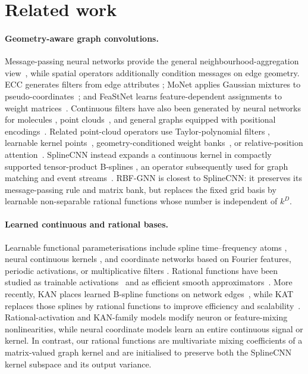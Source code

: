 \documentclass{article} %
\begin{document}
\section{Related work}
\label{sec:related}

\paragraph{Geometry-aware graph convolutions.}
Message-passing neural networks provide the general neighbourhood-aggregation
view~\citep{gilmer2017mpnn}, while spatial operators additionally condition
messages on edge geometry. ECC generates filters from edge attributes
\citep{simonovsky2017ecc}; MoNet applies Gaussian mixtures to
pseudo-coordinates~\citep{monti2017monet}; and FeaStNet learns
feature-dependent assignments to weight matrices~\citep{verma2018feastnet}.
Continuous filters have also been generated by neural networks for molecules
\citep{schutt2017schnet}, point clouds~\citep{wang2018pccnn,wu2019pointconv},
and general graphs equipped with positional encodings~\citep{ma2024ckgconv}.
Related point-cloud operators use Taylor-polynomial filters
\citep{xu2018spidercnn}, learnable kernel points~\citep{thomas2019kpconv},
geometry-conditioned weight banks~\citep{xu2021paconv}, or relative-position
attention~\citep{zhao2021pointtransformer}. SplineCNN instead expands a
continuous kernel in compactly supported tensor-product B-splines
\citep{fey2018splinecnn}, an operator subsequently used for graph matching
\citep{fey2020dgmc} and event streams~\citep{schaefer2022aegnn}. RBF-GNN is
closest to SplineCNN: it preserves its message-passing rule and matrix bank,
but replaces the fixed grid basis by learnable non-separable rational
functions whose number is independent of $k^D$.

\paragraph{Learned continuous and rational bases.}
Learnable functional parameterisations include spline time--frequency atoms
\citep{balestriero2018splinefilters}, neural continuous kernels
\citep{romero2022ckconv,romero2022flexconv}, and coordinate networks based on
Fourier features, periodic activations, or multiplicative filters
\citep{tancik2020fourier,sitzmann2020siren,sahu2021mfn}. Rational functions
have been studied as trainable activations~\citep{molina2020pade} and as
efficient smooth approximators~\citep{boulle2020rational}. More recently, KAN
places learned B-spline functions on network edges~\citep{liu2025kan}, while
KAT replaces those splines by rational functions to improve efficiency and
scalability~\citep{yang2025kat}. Rational-activation and KAN-family models
modify neuron or feature-mixing nonlinearities, while neural coordinate models
learn an entire continuous signal or kernel. In contrast, our rational
functions are multivariate mixing coefficients of a matrix-valued graph kernel
and are initialised to preserve both the SplineCNN kernel subspace and its
output variance.
\end{document}
